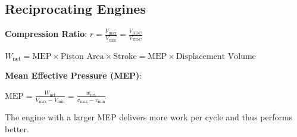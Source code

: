 \documentclass{article}
\begin{document}
\begin{multicols}{3}
    \subsection*{Reciprocating Engines}
    \textbf{Compression Ratio}: $r=\frac{V_\text{max}}{V_\text{min}}=\frac{V_\text{BDC}}{V_\text{TDC}}$\par 
    $W_\text{net}=\text{MEP}\times\text{Piston Area}\times\text{Stroke}=\text{MEP}\times\text{Displacement Volume}$\par 
    \textbf{Mean Effective Pressure (MEP)}:\par 
    $\text{MEP}=\frac{W_\text{net}}{V_\text{max}-V_\text{min}}=\frac{w_\text{net}}{v_\text{max}-v_\text{min}}$\par 
    The engine with a larger MEP delivers more work per cycle and thus performs better.\par 

\end{multicols}
\end{document}
